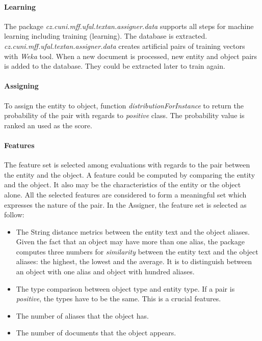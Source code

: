 \paragraph{Learning}
The package \emph{cz.cuni.mff.ufal.textan.assigner.data} supports all steps for
machine learning including training (learning). The database is extracted. 
\emph{cz.cuni.mff.ufal.textan.assigner.data} creates 
artificial pairs of training vectors with \textit{Weka} tool. When a new document is
processed, new entity and object pairs is added to the database. They could be extracted
later to train again.

\paragraph{Assigning}
To assign the entity to object, function \emph{distributionForInstance} to return the 
probability of the pair with regards to \emph{positive} class. The probability value 
is ranked an used as the score.


\paragraph{Features}

The feature set is selected among evaluations with regards to the pair between
the entity and the object. A feature could be computed by comparing the entity 
and the object. It also may be the characteristics of the entity or the object 
alone. All the selected features are considered to form a meaningful set which
expresses the nature of the pair. In the Assigner, the feature set is selected 
as follow:

\begin{itemize}
\item The String distance metrics between the entity text and the object aliases. Given 
the fact that an object may have more than one alias, the package computes three numbers for 
\textit{similarity} between the entity text and the object aliases: the highest, the lowest and
the average. It is to distinguish between an object with one alias and object with hundred aliases.
\item The type comparison between object type and entity type. If a pair is \textit{positive},
the types have to be the same. This is a crucial features. 
\item The number of aliases that the object has.
\item The number of documents that the object appears.  
\end{itemize}


